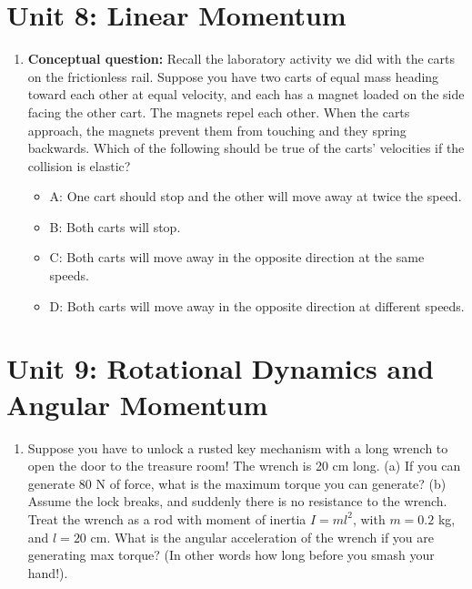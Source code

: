 \documentclass[10pt]{article}
\begin{document}
\section{Unit 8: Linear Momentum}
\begin{enumerate}
\item \textbf{Conceptual question:} Recall the laboratory activity we did with the carts on the frictionless rail. Suppose you
have two carts of equal mass heading toward each other at equal velocity, and each has a magnet loaded on the side
facing the other cart. The magnets repel each other. When the carts approach, the magnets prevent them from
touching and they spring backwards. Which of the following should be true of the carts’ velocities if the collision is
elastic?
\begin{itemize}
\item A: One cart should stop and the other will move away at twice the speed.
\item B: Both carts will stop.
\item C: Both carts will move away in the opposite direction at the same speeds.
\item D: Both carts will move away in the opposite direction at different speeds.
\end{itemize}
\end{enumerate}

\section{Unit 9: Rotational Dynamics and Angular Momentum}
\begin{enumerate}
\item Suppose you have to unlock a rusted key mechanism with a long wrench to open the door to the treasure room!  The wrench is 20 cm long.  (a) If you can generate 80 N of force, what is the maximum torque you can generate?  (b) Assume the lock breaks, and suddenly there is no resistance to the wrench.  Treat the wrench as a rod with moment of inertia $I = m l^2$, with $m = 0.2$ kg, and $l = 20$ cm.  What is the angular acceleration of the wrench if you are generating max torque?  (In other words how long before you smash your hand!).
\end{enumerate}
\end{document}
